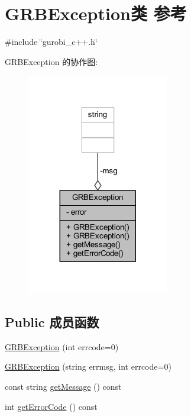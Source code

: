 \hypertarget{classGRBException}{}\section{G\+R\+B\+Exception类 参考}
\label{classGRBException}


{\ttfamily \#include \char`\"{}gurobi\+\_\+c++.\+h\char`\"{}}



G\+R\+B\+Exception 的协作图\+:
\nopagebreak
\begin{figure}[H]
\begin{center}
\leavevmode
\includegraphics[width=176pt]{classGRBException__coll__graph}
\end{center}
\end{figure}
\subsection*{Public 成员函数}
\begin{DoxyCompactItemize}
\item 
\hyperlink{classGRBException_aa93550045a83663e1b5cb17f0751cf02}{G\+R\+B\+Exception} (int errcode=0)
\item 
\hyperlink{classGRBException_af984462e77493569666407c72b85746a}{G\+R\+B\+Exception} (string errmsg, int errcode=0)
\item 
const string \hyperlink{classGRBException_a3340265f7a0ca2f613b82774f801d2ca}{get\+Message} () const 
\item 
int \hyperlink{classGRBException_a6fb8943e914178d4fdbac399b07cfa29}{get\+Error\+Code} () const 
\end{DoxyCompactItemize}
